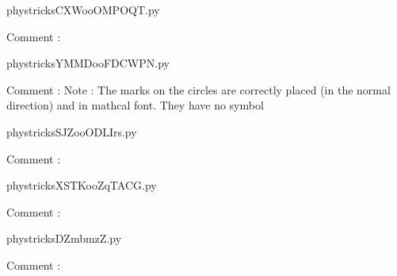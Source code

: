     \newcommand{\CaptionFigCXWooOMPOQT}{<+Type your caption here+>}
    \begin{center}
        
    \end{center}
    phystricksCXWooOMPOQT.py

    Comment : 

    \clearpage
    


    \newcommand{\CaptionFigYMMDooFDCWPN}{<+Type your caption here+>}
    \begin{center}
        
    \end{center}
    phystricksYMMDooFDCWPN.py

    Comment : Note : The marks on the circles are correctly placed (in the normal direction) and in mathcal font. They have no symbol

    \clearpage
    


    \newcommand{\CaptionFigSJZooODLIrs}{<+Type your caption here+>}
    \begin{center}
        
    \end{center}
    phystricksSJZooODLIrs.py

    Comment : 

    \clearpage
    


    \newcommand{\CaptionFigXSTKooZqTACG}{<+Type your caption here+>}
    \begin{center}
        
    \end{center}
    phystricksXSTKooZqTACG.py

    Comment : 

    \clearpage
    


    \newcommand{\CaptionFigDZmbmzZ}{<+Type your caption here+>}
    \begin{center}
        
    \end{center}
    phystricksDZmbmzZ.py

    Comment : 

    \clearpage
    


